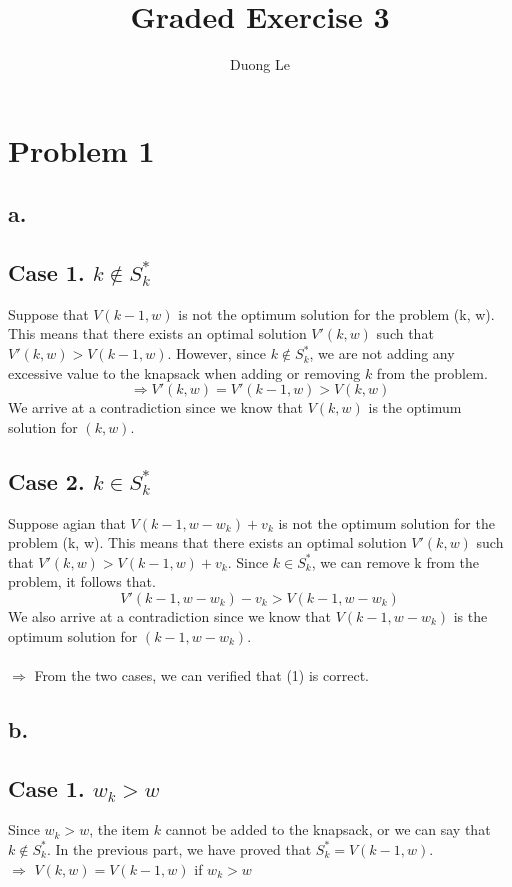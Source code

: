 \documentclass{article}
\title{Graded Exercise 3}
\author{Duong Le}
\date{}
\begin{document}
\maketitle

\section*{Problem 1}
\subsection*{a.}
\subsection*{Case 1. $k \notin S^*_k$}
Suppose that $V(k-1, w)$ is not the optimum solution for the problem (k, w). This means that there exists an optimal solution $V'(k, w)$ such that $V'(k, w) > V(k-1, w)$. However, since $k \notin S^*_k$, we are not adding any excessive value to the knapsack when adding or removing $k$ from the problem.
\[
\Rightarrow V'(k, w) = V'(k-1, w) > V(k, w)
\]
We arrive at a contradiction since we know that $V(k, w)$ is the optimum solution for $(k, w)$.

\subsection*{Case 2. $k \in S^*_k$}
Suppose agian that $V(k-1, w-w_k) + v_k$ is not the optimum solution for the problem (k, w). This means that there exists an optimal solution $V'(k, w)$ such that $V'(k, w) > V(k-1, w) + v_k$. Since $k \in S^*_k$, we can remove k from the problem, it follows that.
\[
V'(k-1, w-w_k) - v_k > V(k-1, w-w_k)
\]
We also arrive at a contradiction since we know that $V(k-1, w-w_k)$ is the optimum solution for $(k-1, w-w_k)$. \\\\

$\Longrightarrow$ From the two cases, we can verified that (1) is correct.


\pagebreak
\subsection*{b.}
\subsection*{Case 1. $w_k > w$}
Since $w_k > w$, the item $k$ cannot be added to the knapsack, or we can say that $k \notin S^*_k$. In the previous part, we have proved that $S^{*}_{k} = V(k-1, w)$. \\
$\Rightarrow$ $V(k, w) = V(k-1, w)$ if $w_k > w$
\end{document}
